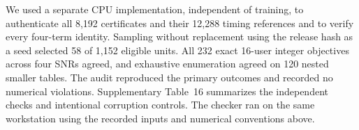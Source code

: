 We used a separate CPU implementation, independent of training, to authenticate all 8,192 certificates and their 12,288 timing references and to verify every four-term identity. Sampling without replacement using the release hash as a seed selected 58 of 1,152 eligible units. All 232 exact 16-user integer objectives across four SNRs agreed, and exhaustive enumeration agreed on 120 nested smaller tables. The audit reproduced the primary outcomes and recorded no numerical violations. Supplementary Table~16 summarizes the independent checks and intentional corruption controls. The checker ran on the same workstation using the recorded inputs and numerical conventions above.

